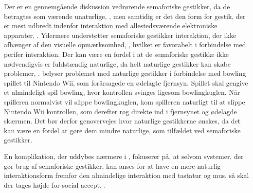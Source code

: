 Der er en gennemgående diskussion vedrørende semaforiske gestikker, da de betragtes som værende unaturlige, \parencite[s. 1961]{PDF:AStudyOnTheUseOfSemaphoricGestures}, men samtidig er det den form for gestik, der er mest udbredt indenfor interaktion med allestedsværende elektroniske apparater, \parencite[s. 28]{PDF:ATaxonomyOfGestures}. Ydermere understøtter semaforiske gestikker interaktion, der ikke afhænger af den visuelle opmærksomhed, \parencite[s. 1964]{PDF:AStudyOnTheUseOfSemaphoricGestures}, hvilket er favorabelt i forbindelse med perifer interaktion. Der kan være en fordel i at de semaforiske gestikke ikke nødvendigvis er fuldstændig naturlige, da helt naturlige gestikker kan skabe problemer, \parencite[s. 9]{PDF:NaturalUserInterfaces}. \textcite[s. 9]{PDF:NaturalUserInterfaces} belyser problemet med naturlige gestikker i forbindelse med bowling spillet til Nintendo Wii, som forårsagede en ødelagte fjernsyn. Spillet skal gengive et almindeligt spil bowling, hvor kontrollen svinges ligesom bowlingkuglen. Når spilleren normalvist vil slippe bowlingkuglen, kom spilleren naturligt til at slippe Nintendo Wii kontrollen, som derefter røg direkte ind i fjernsynet og ødelagde skærmen. Det bør derfor genovervejes hvor naturlige gestikkerne ønskes, da det kan være en fordel at gøre dem mindre naturlige, som tilfældet ved semaforiske gestikker.

En komplikation, der uddybes nærmere i , fokuserer på, at selvom systemer, der gør brug af semaforiske gestikker, kan anses for at have en mere naturlig interaktionsform fremfor den almindelige interaktion med tastatur og mus, så skal der tages højde for social accept, \parencite[s. 275]{PDF:WouldYouDoThat}. 
%
